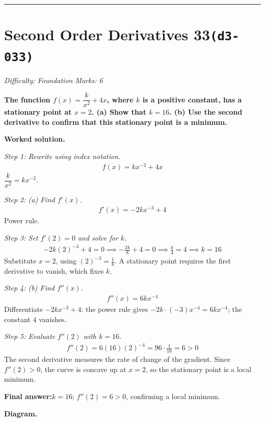 \documentclass[11pt]{article}
\newcommand{\question}[1]{\par\medskip\noindent\textbf{#1}\par}
\begin{document}
\medskip\hrule

\section*{Second Order Derivatives 33\quad\small\texttt{(d3-033)}}
\textit{Difficulty: Foundation \quad\textbar\quad Marks: 6}

\question{The function \( f(x) = \dfrac{k}{x^2} + 4x \), where \( k \) is a positive constant, has a stationary point at \( x = 2 \). (a) Show that \( k = 16 \). (b) Use the second derivative to confirm that this stationary point is a minimum.}

\textbf{Worked solution.}

\textit{Step 1: Rewrite using index notation.}
\[\begin{gathered}
f(x) = kx^{-2} + 4x
\end{gathered}\]
\( \dfrac{k}{x^2} = kx^{-2} \).

\textit{Step 2: (a) Find \( f'(x) \).}
\[\begin{gathered}
f'(x) = -2kx^{-3} + 4
\end{gathered}\]
Power rule.

\textit{Step 3: Set \( f'(2) = 0 \) and solve for \( k \).}
\[\begin{gathered}
-2k(2)^{-3} + 4 = 0 \implies -\tfrac{2k}{8} + 4 = 0 \implies \tfrac{k}{4} = 4 \implies k = 16
\end{gathered}\]
Substitute \( x = 2 \), using \( (2)^{-3} = \tfrac{1}{8} \). A stationary point requires the first derivative to vanish, which fixes \( k \).

\textit{Step 4: (b) Find \( f''(x) \).}
\[\begin{gathered}
f''(x) = 6kx^{-4}
\end{gathered}\]
Differentiate \( -2kx^{-3} + 4 \): the power rule gives \( -2k \cdot (-3) x^{-4} = 6kx^{-4} \); the constant \(4\) vanishes.

\textit{Step 5: Evaluate \( f''(2) \) with \( k = 16 \).}
\[\begin{gathered}
f''(2) = 6(16)(2)^{-4} = 96 \cdot \tfrac{1}{16} = 6 > 0
\end{gathered}\]
The second derivative measures the rate of change of the gradient. Since \( f''(2) > 0 \), the curve is concave up at \( x = 2 \), so the stationary point is a local minimum.

\begin{answerbox}
\textbf{Final answer:}\quad \(\displaystyle  k = 16 \); \(\displaystyle  f''(2) = 6 > 0 \), confirming a local minimum.
\end{answerbox}
\textbf{Diagram.}
\end{document}

